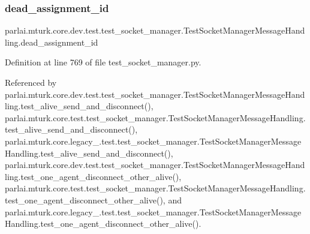 \mbox{\label{classparlai_1_1mturk_1_1core_1_1dev_1_1test_1_1test__socket__manager_1_1TestSocketManagerMessageHandling_afa362bc16ba31c2b65e4e1d205edaba9}} 
\subsubsection{\texorpdfstring{dead\+\_\+assignment\+\_\+id}{dead\_assignment\_id}}
{\footnotesize\ttfamily parlai.\+mturk.\+core.\+dev.\+test.\+test\+\_\+socket\+\_\+manager.\+Test\+Socket\+Manager\+Message\+Handling.\+dead\+\_\+assignment\+\_\+id}



Definition at line 769 of file test\+\_\+socket\+\_\+manager.\+py.



Referenced by parlai.\+mturk.\+core.\+dev.\+test.\+test\+\_\+socket\+\_\+manager.\+Test\+Socket\+Manager\+Message\+Handling.\+test\+\_\+alive\+\_\+send\+\_\+and\+\_\+disconnect(), parlai.\+mturk.\+core.\+test.\+test\+\_\+socket\+\_\+manager.\+Test\+Socket\+Manager\+Message\+Handling.\+test\+\_\+alive\+\_\+send\+\_\+and\+\_\+disconnect(), parlai.\+mturk.\+core.\+legacy\+\_.\+test.\+test\+\_\+socket\+\_\+manager.\+Test\+Socket\+Manager\+Message\+Handling.\+test\+\_\+alive\+\_\+send\+\_\+and\+\_\+disconnect(), parlai.\+mturk.\+core.\+dev.\+test.\+test\+\_\+socket\+\_\+manager.\+Test\+Socket\+Manager\+Message\+Handling.\+test\+\_\+one\+\_\+agent\+\_\+disconnect\+\_\+other\+\_\+alive(), parlai.\+mturk.\+core.\+test.\+test\+\_\+socket\+\_\+manager.\+Test\+Socket\+Manager\+Message\+Handling.\+test\+\_\+one\+\_\+agent\+\_\+disconnect\+\_\+other\+\_\+alive(), and parlai.\+mturk.\+core.\+legacy\+\_.\+test.\+test\+\_\+socket\+\_\+manager.\+Test\+Socket\+Manager\+Message\+Handling.\+test\+\_\+one\+\_\+agent\+\_\+disconnect\+\_\+other\+\_\+alive().

